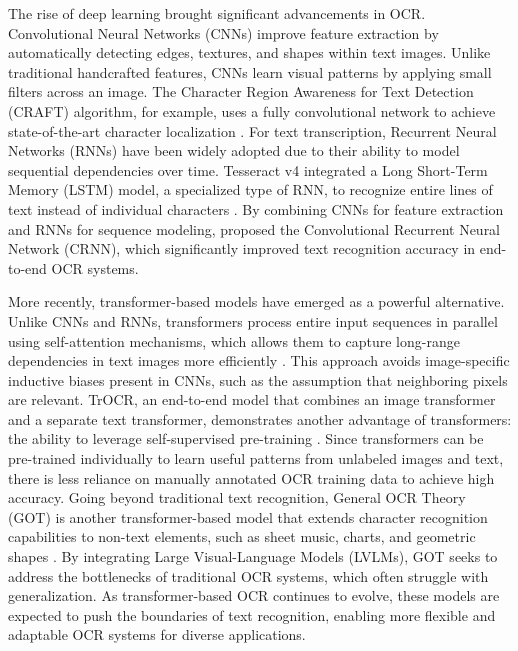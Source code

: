 \documentclass[12pt,oneside]{memoir}
\begin{document}
The rise of deep learning brought significant advancements in OCR.
Convolutional Neural Networks (CNNs) improve feature extraction by automatically detecting edges, textures, and shapes within text images.
Unlike traditional handcrafted features, CNNs learn visual patterns by applying small filters across an image. 
The Character Region Awareness for Text Detection (CRAFT) algorithm, for example, uses a fully convolutional network to achieve state-of-the-art character localization \parencite{baek-etal-2019}.
For text transcription, Recurrent Neural Networks (RNNs) have been widely adopted due to their ability to model sequential dependencies over time.
Tesseract v4 integrated a Long Short-Term Memory (LSTM) model, a specialized type of RNN, to recognize entire lines of text instead of individual characters \parencite{tesseract-2025}.
By combining CNNs for feature extraction and RNNs for sequence modeling, \textcite{shi-etal-2015} proposed the Convolutional Recurrent Neural Network (CRNN), which significantly improved text recognition accuracy in end-to-end OCR systems.

More recently, transformer-based models have emerged as a powerful alternative.
Unlike CNNs and RNNs, transformers process entire input sequences in parallel using self-attention mechanisms, which allows them to capture long-range dependencies in text images more efficiently \parencite{vaswani-2017}.
This approach avoids image-specific inductive biases present in CNNs, such as the assumption that neighboring pixels are relevant.
TrOCR, an end-to-end model that combines an image transformer and a separate text transformer, demonstrates another advantage of transformers: the ability to leverage self-supervised pre-training \parencite{li-etal-2021}. 
Since transformers can be pre-trained individually to learn useful patterns from unlabeled images and text, there is less reliance on manually annotated OCR training data to achieve high accuracy.
Going beyond traditional text recognition, General OCR Theory (GOT) is another transformer-based model that extends character recognition capabilities to non-text elements, such as sheet music, charts, and geometric shapes \parencite{wei-etal-2024}.
By integrating Large Visual-Language Models (LVLMs), GOT seeks to address the bottlenecks of traditional OCR systems, which often struggle with generalization.
As transformer-based OCR continues to evolve, these models are expected to push the boundaries of text recognition, enabling more flexible and adaptable OCR systems for diverse applications.
\end{document}
